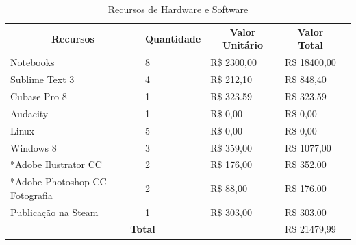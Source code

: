 \documentclass[11pt]{article} %
\begin{document}
\begin{table}[h]
\begin{tabular}{|l|l|l|l|l}
\cline{1-4}
\multicolumn{1}{|c|}{\textbf{Recursos}} & \multicolumn{1}{c|}{\textbf{Quantidade}} & \multicolumn{1}{c|}{\textbf{Valor Unitário}} & \multicolumn{1}{c|}{\textbf{Valor Total}} &  \\ \cline{1-4}
Notebooks                               & 8                                        & R\$ 2300,00                                  & R\$ 18400,00                              &  \\ \cline{1-4}
Sublime Text 3                          & 4                                        & R\$ 212,10                                   & R\$ 848,40                                &  \\ \cline{1-4}
Cubase Pro 8                            & 1                                        & R\$ 323.59                                   & R\$ 323.59                                &  \\ \cline{1-4}
Audacity                                & 1                                        & R\$ 0,00                                     & R\$ 0,00                                  &  \\ \cline{1-4}
Linux                                   & 5                                        & R\$ 0,00                                     & R\$ 0,00                                  &  \\ \cline{1-4}
Windows 8                               & 3                                        & R\$ 359,00                                   & R\$ 1077,00                               &  \\ \cline{1-4}
*Adobe Ilustrator CC                    & 2                                        & R\$ 176,00                                   & R\$ 352,00                                &  \\ \cline{1-4}
*Adobe Photoshop CC Fotografia          & 2                                        & R\$ 88,00                                    & R\$ 176,00                                &  \\ \cline{1-4}
Publicação na Steam                     & 1                                        & R\$ 303,00                                   & R\$ 303,00                                &  \\ \cline{1-4}
\multicolumn{3}{|c|}{\textbf{Total}}                                                                                              & R\$ 21479,99                              &  \\ \cline{1-4}
\end{tabular}
\caption {Recursos de Hardware e Software}
\end{table}
\end{document}
